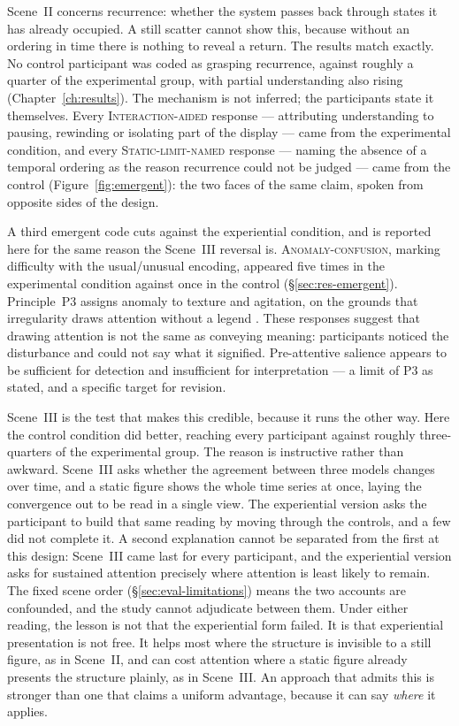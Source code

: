 Scene~II concerns recurrence: whether the system passes back through states it has already occupied. A still scatter cannot show this, because without an ordering in time there is nothing to reveal a return. The results match exactly. No control participant was coded as grasping recurrence, against roughly a quarter of the experimental group, with partial understanding also rising (Chapter~\ref{ch:results}). The mechanism is not inferred; the participants state it themselves. Every \textsc{Interaction-aided} response --- attributing understanding to pausing, rewinding or isolating part of the display --- came from the experimental condition, and every \textsc{Static-limit-named} response --- naming the absence of a temporal ordering as the reason recurrence could not be judged --- came from the control (Figure~\ref{fig:emergent}): the two faces of the same claim, spoken from opposite sides of the design.

A third emergent code cuts against the experiential condition, and is reported here for the same reason the Scene~III reversal is. \textsc{Anomaly-confusion}, marking difficulty with the usual/unusual encoding, appeared five times in the experimental condition against once in the control (\S\ref{sec:res-emergent}). Principle~P3 assigns anomaly to texture and agitation, on the grounds that irregularity draws attention without a legend \parencite{bertin1983, ware2021}. These responses suggest that drawing attention is not the same as conveying meaning: participants noticed the disturbance and could not say what it signified. Pre-attentive salience appears to be sufficient for detection and insufficient for interpretation --- a limit of P3 as stated, and a specific target for revision.

Scene~III is the test that makes this credible, because it runs the other way. Here the control condition did better, reaching every participant against roughly three-quarters of the experimental group. The reason is instructive rather than awkward. Scene~III asks whether the agreement between three models changes over time, and a static figure shows the whole time series at once, laying the convergence out to be read in a single view. The experiential version asks the participant to build that same reading by moving through the controls, and a few did not complete it. A second explanation cannot be separated from the first at this design: Scene~III came last for every participant, and the experiential version asks for sustained attention precisely where attention is least likely to remain. The fixed scene order (\S\ref{sec:eval-limitations}) means the two accounts are confounded, and the study cannot adjudicate between them. Under either reading, the lesson is not that the experiential form failed. It is that experiential presentation is not free. It helps most where the structure is invisible to a still figure, as in Scene~II, and can cost attention where a static figure already presents the structure plainly, as in Scene~III. An approach that admits this is stronger than one that claims a uniform advantage, because it can say \emph{where} it applies.


